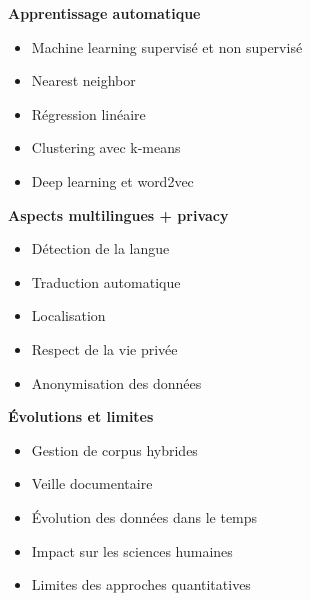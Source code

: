 \noindent\textbf{Apprentissage automatique}
\begin{itemize}
\item Machine learning supervisé et non supervisé
\item Nearest neighbor
\item Régression linéaire
\item Clustering avec k-means
\item Deep learning et word2vec\\
\end{itemize}

\noindent\textbf{Aspects multilingues + privacy}
\begin{itemize}
\item Détection de la langue
\item Traduction automatique
\item Localisation
\item Respect de la vie privée
\item Anonymisation des données\\
\end{itemize}

\noindent\textbf{Évolutions et limites}
\begin{itemize}
\item Gestion de corpus hybrides
\item Veille documentaire
\item Évolution des données dans le temps
\item Impact sur les sciences humaines
\item Limites des approches quantitatives\\
\end{itemize}
